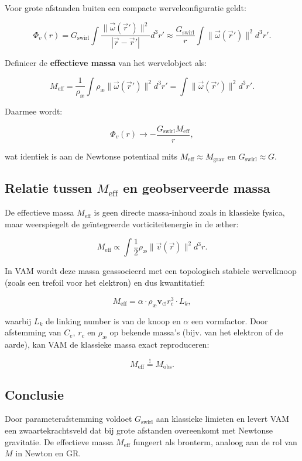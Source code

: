 Voor grote afstanden buiten een compacte wervelconfiguratie geldt:

\begin{equation}
\Phi_v(r) = G_\text{swirl} \int \frac{\|\vec{\omega}(\vec{r}')\|^2}{|\vec{r} - \vec{r}'|} d^3r' \approx \frac{G_\text{swirl}}{r} \int \|\vec{\omega}(\vec{r}')\|^2 d^3r'.
\end{equation}

Definieer de \textbf{effectieve massa} van het wervelobject als:

\begin{equation}
M_\text{eff} = \frac{1}{\rho_\text{æ}} \int \rho_\text{æ} \|\vec{\omega}(\vec{r}')\|^2 d^3r' = \int \|\vec{\omega}(\vec{r}')\|^2 d^3r'.
\end{equation}

Daarmee wordt:

\begin{equation}
\Phi_v(r) \to -\frac{G_\text{swirl} M_\text{eff}}{r},
\end{equation}

wat identiek is aan de Newtonse potentiaal mits $M_\text{eff} \approx M_\text{grav}$ en $G_\text{swirl} \approx G$.

\subsection{Relatie tussen $M_\text{eff}$ en geobserveerde massa}

De effectieve massa $M_\text{eff}$ is geen directe massa-inhoud zoals in klassieke fysica, maar weerspiegelt de geïntegreerde vorticiteitenergie in de æther:

\begin{equation}
  M_\text{eff} \propto \int \frac{1}{2} \rho_\text{æ} \|\vec{v}(\vec{r})\|^2 d^3r.
\end{equation}

In VAM wordt deze massa geassocieerd met een topologisch stabiele wervelknoop (zoals een trefoil voor het elektron) en dus kwantitatief:

\begin{equation}
M_\text{eff} = \alpha \cdot \rho_\text{æ} \mathbf{v}_{\scriptscriptstyle\boldsymbol{\circlearrowleft}} r_c^3 \cdot L_k,
\end{equation}

waarbij $L_k$ de linking number is van de knoop en $\alpha$ een vormfactor. Door afstemming van $C_e$, $r_c$ en $\rho_\text{æ}$ op bekende massa's (bijv. van het elektron of de aarde), kan VAM de klassieke massa exact reproduceren:

\begin{equation}
M_\text{eff} \overset{!}{=} M_\text{obs}.
\end{equation}

\subsection{Conclusie}

Door parameterafstemming voldoet $G_\text{swirl}$ aan klassieke limieten en levert VAM een zwaartekrachtsveld dat bij grote afstanden overeenkomt met Newtonse gravitatie. De effectieve massa $M_\text{eff}$ fungeert als bronterm, analoog aan de rol van $M$ in Newton en GR.